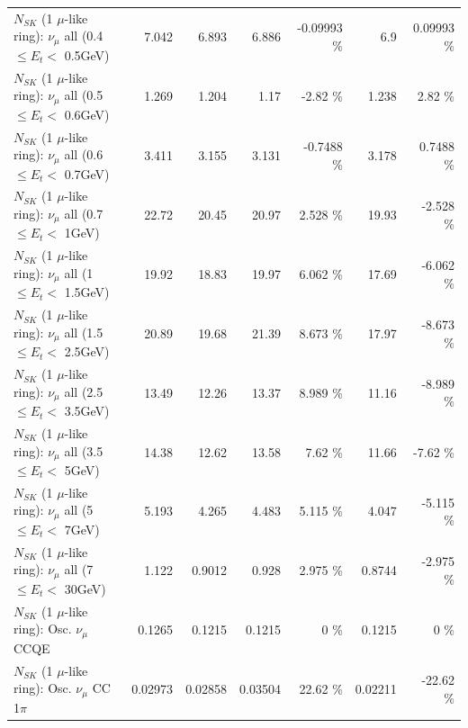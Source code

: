 \begin{table}
\begin{tabular}{| l | r | r | r  r | r  r |}
       $N_{SK}$ (1 $\mu$-like ring): $\nu_{\mu}$ all (0.4 $\leq E_{t} <$ 0.5GeV) &           7.042 &           6.893 &           6.886 & -0.09993 \%  &             6.9 &  0.09993 \%  \\ 
       $N_{SK}$ (1 $\mu$-like ring): $\nu_{\mu}$ all (0.5 $\leq E_{t} <$ 0.6GeV) &           1.269 &           1.204 &            1.17 &    -2.82 \%  &           1.238 &     2.82 \%  \\ 
       $N_{SK}$ (1 $\mu$-like ring): $\nu_{\mu}$ all (0.6 $\leq E_{t} <$ 0.7GeV) &           3.411 &           3.155 &           3.131 &  -0.7488 \%  &           3.178 &   0.7488 \%  \\ 
         $N_{SK}$ (1 $\mu$-like ring): $\nu_{\mu}$ all (0.7 $\leq E_{t} <$ 1GeV) &           22.72 &           20.45 &           20.97 &    2.528 \%  &           19.93 &   -2.528 \%  \\ 
         $N_{SK}$ (1 $\mu$-like ring): $\nu_{\mu}$ all (1 $\leq E_{t} <$ 1.5GeV) &           19.92 &           18.83 &           19.97 &    6.062 \%  &           17.69 &   -6.062 \%  \\ 
       $N_{SK}$ (1 $\mu$-like ring): $\nu_{\mu}$ all (1.5 $\leq E_{t} <$ 2.5GeV) &           20.89 &           19.68 &           21.39 &    8.673 \%  &           17.97 &   -8.673 \%  \\ 
       $N_{SK}$ (1 $\mu$-like ring): $\nu_{\mu}$ all (2.5 $\leq E_{t} <$ 3.5GeV) &           13.49 &           12.26 &           13.37 &    8.989 \%  &           11.16 &   -8.989 \%  \\ 
         $N_{SK}$ (1 $\mu$-like ring): $\nu_{\mu}$ all (3.5 $\leq E_{t} <$ 5GeV) &           14.38 &           12.62 &           13.58 &     7.62 \%  &           11.66 &    -7.62 \%  \\ 
           $N_{SK}$ (1 $\mu$-like ring): $\nu_{\mu}$ all (5 $\leq E_{t} <$ 7GeV) &           5.193 &           4.265 &           4.483 &    5.115 \%  &           4.047 &   -5.115 \%  \\ 
          $N_{SK}$ (1 $\mu$-like ring): $\nu_{\mu}$ all (7 $\leq E_{t} <$ 30GeV) &           1.122 &          0.9012 &           0.928 &    2.975 \%  &          0.8744 &   -2.975 \%  \\ 
\hline
\hline
                               $N_{SK}$ (1 $\mu$-like ring): Osc. $\nu_\mu$ CCQE &          0.1265 &          0.1215 &          0.1215 &        0 \%  &          0.1215 &        0 \%  \\ 
                          $N_{SK}$ (1 $\mu$-like ring): Osc. $\nu_\mu$ CC 1$\pi$ &         0.02973 &         0.02858 &         0.03504 &    22.62 \%  &         0.02211 &   -22.62 \%  \\ 

\end{tabular}
\end{table}
